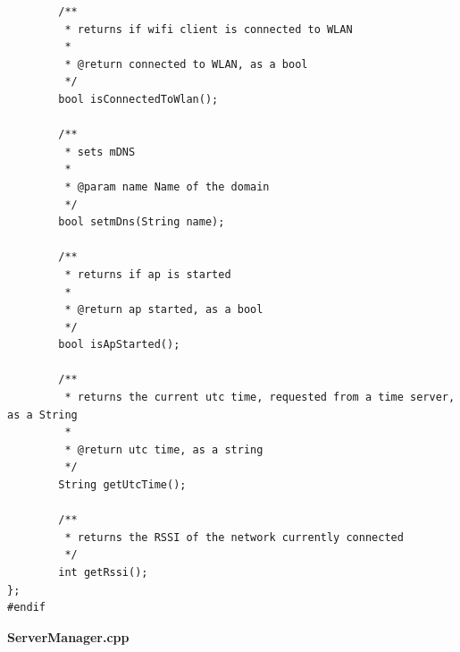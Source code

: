 \documentclass[11pt, twoside]{article}
\begin{document}
\begin{lstlisting}
        /**
         * returns if wifi client is connected to WLAN
         * 
         * @return connected to WLAN, as a bool
         */
        bool isConnectedToWlan();

        /**
         * sets mDNS
         * 
         * @param name Name of the domain
         */
        bool setmDns(String name);

        /**
         * returns if ap is started
         * 
         * @return ap started, as a bool
         */
        bool isApStarted();

        /**
         * returns the current utc time, requested from a time server, as a String
         * 
         * @return utc time, as a string
         */
        String getUtcTime();

        /**
         * returns the RSSI of the network currently connected
         */
        int getRssi();
};
#endif\end{lstlisting}

\textbf{ServerManager.cpp}
\end{document}
